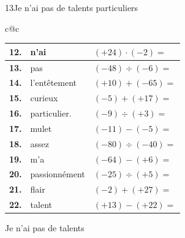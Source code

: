 \begin{exercice}{13}{Je n'ai pas de talents particuliers}
\begin{center}
\begin{tabular}{c@{\hspace{8mm}}c}
  \begin{tabular}{|>{\centering\arraybackslash}p{6mm}|p{3.5cm}|p{3cm}|}
    \hline
    \cellcolor{gray!40}\textbf{12.} &n'ai& $(+24)\cdot(-2)=$             \\ \hline
    \cellcolor{gray!40}\textbf{13.} &pas& $(-48)\div(-6)=$               \\ \hline
    \cellcolor{gray!40}\textbf{14.} &l'entêtement& $(+10)+(-65)=$                \\ \hline
    \cellcolor{gray!40}\textbf{15.} &curieux& $(-5)+(+17)=$                 \\ \hline
    \cellcolor{gray!40}\textbf{16.} &particulier.& $(-9)\div(+3)=$                \\ \hline
    \cellcolor{gray!40}\textbf{17.} &mulet& $(-11)-(-5)=$       \\ \hline
    \cellcolor{gray!40}\textbf{18.} &assez& $(-80)\div(-40)=$              \\ \hline
    \cellcolor{gray!40}\textbf{19.} &m'a& $(-64)-(+6)=$      \\ \hline
    \cellcolor{gray!40}\textbf{20.} &passionnément& $(-25)\div(+5)=$               \\ \hline
    \cellcolor{gray!40}\textbf{21.} &flair& $(-2)+(+27)=$                 \\ \hline
    \cellcolor{gray!40}\textbf{22.} &talent& $(+13)-(+22)=$     \\ \hline
  \end{tabular}

\end{tabular}
\end{center}

\bigskip
\noindent Je n'ai pas de talents \dotfill \\
\vspace{1cm}
\noindent\dotfill\\[0.5cm]
\dotfill
{}

\end{exercice}
